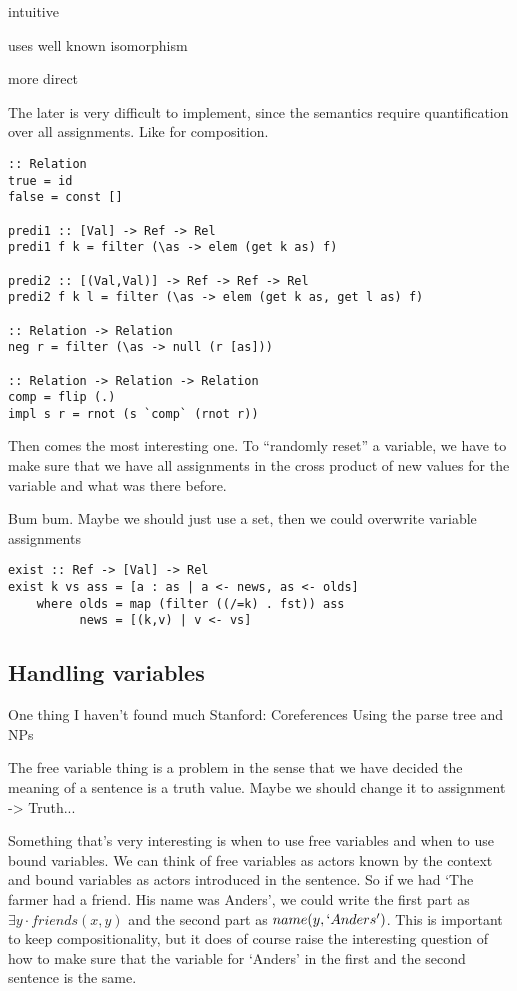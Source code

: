 \documentclass[12pt]{article}
\begin{document}
intuitive

uses well known isomorphism

more direct

The later is very difficult to implement, since the semantics require quantification over all assignments. Like for composition.

\begin{lstlisting}
:: Relation
true = id
false = const []

predi1 :: [Val] -> Ref -> Rel
predi1 f k = filter (\as -> elem (get k as) f)

predi2 :: [(Val,Val)] -> Ref -> Ref -> Rel
predi2 f k l = filter (\as -> elem (get k as, get l as) f)

:: Relation -> Relation
neg r = filter (\as -> null (r [as]))

:: Relation -> Relation -> Relation
comp = flip (.)
impl s r = rnot (s `comp` (rnot r))
\end{lstlisting}
Then comes the most interesting one. To ``randomly reset'' a variable, we have to make sure that we have all assignments in the cross product of new values for the variable and what was there before.

Bum bum. Maybe we should just use a set, then we could overwrite variable assignments
\begin{lstlisting}
exist :: Ref -> [Val] -> Rel
exist k vs ass = [a : as | a <- news, as <- olds]
	where olds = map (filter ((/=k) . fst)) ass
	      news = [(k,v) | v <- vs]
\end{lstlisting}

\subsection{Handling variables}
One thing I haven't found much \cite{visser1999donkey}
Stanford: \cite{lee2013deterministic}
\cite{lee2011stanford}
\cite{raghunathan2010multi}
Coreferences
Using the parse tree and NPs

The free variable thing is a problem in the sense that we have decided the meaning of a sentence is a truth value. Maybe we should change it to assignment -> Truth...

Something that's very interesting is when to use free variables and when to use bound variables. We can think of free variables as actors known by the context and bound variables as actors introduced in the sentence. So if we had `The farmer had a friend. His name was Anders', we could write the first part as $\exists y \cdot friends(x,y)$ and the second part as $name(y, `Anders')$. This is important to keep compositionality, but it does of course raise the interesting question of how to make sure that the variable for `Anders' in the first and the second sentence is the same.
\end{document}
